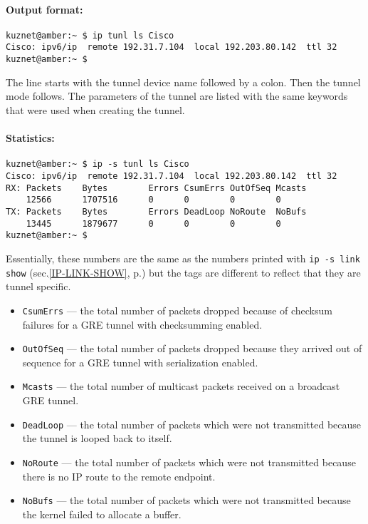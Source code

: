 \paragraph{Output format:}
\begin{verbatim}
kuznet@amber:~ $ ip tunl ls Cisco
Cisco: ipv6/ip  remote 192.31.7.104  local 192.203.80.142  ttl 32 
kuznet@amber:~ $ 
\end{verbatim}
The line starts with the tunnel device name followed by a colon.
Then the tunnel mode follows. The parameters of the tunnel are listed
with the same keywords that were used when creating the tunnel.

\paragraph{Statistics:}

\begin{verbatim}
kuznet@amber:~ $ ip -s tunl ls Cisco
Cisco: ipv6/ip  remote 192.31.7.104  local 192.203.80.142  ttl 32 
RX: Packets    Bytes        Errors CsumErrs OutOfSeq Mcasts
    12566      1707516      0      0        0        0       
TX: Packets    Bytes        Errors DeadLoop NoRoute  NoBufs
    13445      1879677      0      0        0        0     
kuznet@amber:~ $ 
\end{verbatim}
Essentially, these numbers are the same as the numbers
printed with {\tt ip -s link show}
(sec.\ref{IP-LINK-SHOW}, p.\pageref{IP-LINK-SHOW}) but the tags are different
to reflect that they are tunnel specific.
\begin{itemize}
\item \verb|CsumErrs| --- the total number of packets dropped
because of checksum failures for a GRE tunnel with checksumming enabled.
\item \verb|OutOfSeq| --- the total number of packets dropped
because they arrived out of sequence for a GRE tunnel with
serialization enabled.
\item \verb|Mcasts| --- the total number of multicast packets
received on a broadcast GRE tunnel.
\item \verb|DeadLoop| --- the total number of packets which were not
transmitted because the tunnel is looped back to itself.
\item \verb|NoRoute| --- the total number of packets which were not
transmitted because there is no IP route to the remote endpoint.
\item \verb|NoBufs| --- the total number of packets which were not
transmitted because the kernel failed to allocate a buffer.
\end{itemize}



